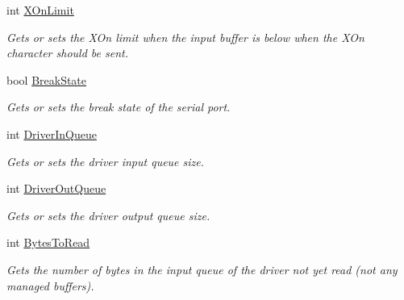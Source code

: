 \begin{DoxyCompactItemize}
int \mbox{\hyperlink{class_r_j_c_p_1_1_i_o_1_1_ports_1_1_native_1_1_unix_native_serial_ae9ce2190791a37c339f63b397d0301ef}{X\+On\+Limit}}
\begin{DoxyCompactList}\small\item\em Gets or sets the X\+On limit when the input buffer is below when the X\+On character should be sent. \end{DoxyCompactList}\item 
bool \mbox{\hyperlink{class_r_j_c_p_1_1_i_o_1_1_ports_1_1_native_1_1_unix_native_serial_af0fde9af98d93aacbcf762007e198ad7}{Break\+State}}
\begin{DoxyCompactList}\small\item\em Gets or sets the break state of the serial port. \end{DoxyCompactList}\item 
int \mbox{\hyperlink{class_r_j_c_p_1_1_i_o_1_1_ports_1_1_native_1_1_unix_native_serial_a582b740b781f6a716abaae934a8e3cc4}{Driver\+In\+Queue}}
\begin{DoxyCompactList}\small\item\em Gets or sets the driver input queue size. \end{DoxyCompactList}\item 
int \mbox{\hyperlink{class_r_j_c_p_1_1_i_o_1_1_ports_1_1_native_1_1_unix_native_serial_a297938530cf9379f954ddb9300846e62}{Driver\+Out\+Queue}}
\begin{DoxyCompactList}\small\item\em Gets or sets the driver output queue size. \end{DoxyCompactList}\item 
int \mbox{\hyperlink{class_r_j_c_p_1_1_i_o_1_1_ports_1_1_native_1_1_unix_native_serial_a693660fee4e4d701169860679e3266ed}{Bytes\+To\+Read}}
\begin{DoxyCompactList}\small\item\em Gets the number of bytes in the input queue of the driver not yet read (not any managed buffers). \end{DoxyCompactList}\item 

\end{DoxyCompactItemize}
